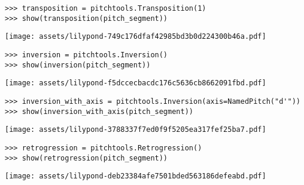 \begin{singlespacing}
\vspace{-0.5\baselineskip}
\begin{lstlisting}
>>> transposition = pitchtools.Transposition(1)
>>> show(transposition(pitch_segment))
\end{lstlisting}
\noindent\texttt{[image: assets/lilypond-749c176dfaf42985bd3b0d224300b46a.pdf]}
\end{singlespacing}

\begin{comment}
<abjad>
inversion = pitchtools.Inversion()
show(inversion(pitch_segment))
inversion_with_axis = pitchtools.Inversion(axis=NamedPitch("d'"))
show(inversion_with_axis(pitch_segment))
</abjad>
\end{comment}

\begin{singlespacing}
\vspace{-0.5\baselineskip}
\begin{lstlisting}
>>> inversion = pitchtools.Inversion()
>>> show(inversion(pitch_segment))
\end{lstlisting}
\noindent\texttt{[image: assets/lilypond-f5dccecbacdc176c5636cb8662091fbd.pdf]}
\begin{lstlisting}
>>> inversion_with_axis = pitchtools.Inversion(axis=NamedPitch("d'"))
>>> show(inversion_with_axis(pitch_segment))
\end{lstlisting}
\noindent\texttt{[image: assets/lilypond-3788337f7ed0f9f5205ea317fef25ba7.pdf]}
\end{singlespacing}

\begin{comment}
<abjad>
retrogression = pitchtools.Retrogression()
show(retrogression(pitch_segment))
</abjad>
\end{comment}

\begin{singlespacing}
\vspace{-0.5\baselineskip}
\begin{lstlisting}
>>> retrogression = pitchtools.Retrogression()
>>> show(retrogression(pitch_segment))
\end{lstlisting}
\noindent\texttt{[image: assets/lilypond-deb23384afe7501bded563186defeabd.pdf]}
\end{singlespacing}

